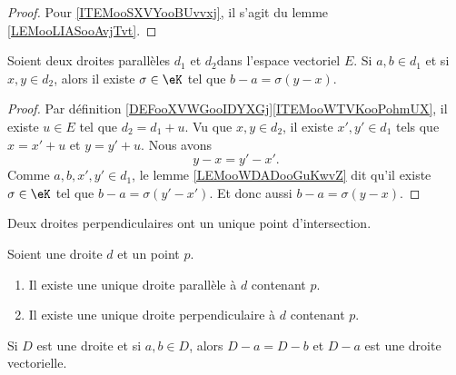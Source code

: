 \begin{proof}
	Pour \ref{ITEMooSXVYooBUvvxj}, il s'agit du lemme \ref{LEMooLIASooAvjTvt}.
\end{proof}

\begin{proposition}	\label{PROPooKWJLooIYVKhs}
	Soient deux droites parallèles \( d_1\) et \( d_2\)dans l'espace vectoriel \( E\). Si \( a,b\in d_1\) et si \( x,y\in d_2\), alors il existe \( \sigma\in \eK\) tel que \( b-a=\sigma(y-x)\).
\end{proposition}

\begin{proof}
	Par définition \ref{DEFooXVWGooIDYXGj}\ref{ITEMooWTVKooPohmUX}, il existe \( u\in E\) tel que \( d_2=d_1+u\). Vu que \( x,y\in d_2\), il existe \( x',y'\in d_1\) tels que \( x=x'+u\) et \( y=y'+u\). Nous avons
	\begin{equation}
		y-x=y'-x'.
	\end{equation}
	Comme \( a,b,x',y'\in d_1\), le lemme \ref{LEMooWDADooGuKwvZ} dit qu'il existe \( \sigma\in \eK\) tel que \( b-a=\sigma(y'-x')\). Et donc aussi \( b-a=\sigma(y-x)\).
\end{proof}

\begin{lemma}       \label{LEMooRLFQooJADark}
	Deux droites perpendiculaires ont un unique point d'intersection.
\end{lemma}

\begin{proposition}     \label{PROPooPWNWooYuyrOc}
	Soient une droite \( d\) et un point \( p\).
	\begin{enumerate}
		\item
		      Il existe une unique droite parallèle à \( d\) contenant \( p\).
		\item
		      Il existe une unique droite perpendiculaire à \( d\) contenant \( p\).
	\end{enumerate}
\end{proposition}

\begin{lemma}       \label{LEMooQQFFooEZYeck}
	Si \( D\) est une droite et si \( a,b\in D\), alors \( D-a=D-b\) et \( D-a\) est une droite vectorielle.
\end{lemma}


